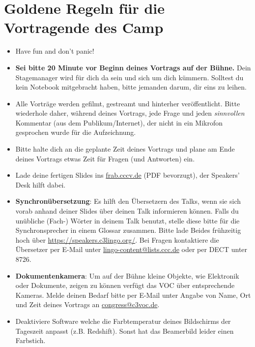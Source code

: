 \documentclass[paper=a4]{scrartcl}
\begin{document}
\section*{Goldene Regeln für die Vortragende des Camp}
\begin{itemize}
	\item Have fun and don't panic!
	\item \textbf{Sei bitte 20 Minute vor Beginn deines Vortrags auf der Bühne.} Dein Stagemanager wird für dich da sein und sich um dich kümmern. Solltest du kein Notebook mitgebracht haben, bitte jemanden darum, dir eins zu leihen.
	\item Alle Vorträge werden gefilmt, gestreamt und hinterher veröffentlicht. Bitte wiederhole daher, während deines Vortrags, jede Frage und jeden \textit{sinnvollen} Kommentar (aus dem Publikum/Internet), der nicht in ein Mikrofon gesprochen wurde für die Aufzeichnung.
	\item Bitte halte dich an die geplante Zeit deines Vortrags und plane am Ende deines Vortrags etwas Zeit für Fragen (und Antworten) ein.
	\item Lade deine fertigen Slides ins \url{frab.cccv.de} (PDF bevorzugt), der Speakers' Desk hilft dabei. %
	\item \textbf{Synchronübersetzung}: Es hilft den Übersetzern des Talks, wenn sie sich vorab anhand deiner Slides über deinen Talk informieren können. Falls du unübliche (Fach-\nobreak) Wörter in deinem Talk benutzt, stelle diese bitte für die Synchronsprecher in einem Glossar zusammen. Bitte lade Beides frühzeitig hoch über \url{https://speakers.c3lingo.org/}. Bei Fragen kontaktiere die Übersetzer per E-Mail unter \url{lingo-content@lists.ccc.de} oder per DECT unter 8726.
	\item \textbf{Dokumentenkamera}: Um auf der Bühne kleine Objekte, wie Elektronik oder Dokumente, zeigen zu können verfügt das VOC über entsprechende Kameras. Melde deinen Bedarf bitte per E-Mail unter Angabe von Name, Ort und Zeit deines Vortrags an \url{congress@c3voc.de}.
	\item Deaktiviere Software welche die Farbtemperatur deines Bildschirms der Tageszeit anpasst (z.B. Redshift). Sonst hat das Beamerbild leider einen Farbstich.
\end{itemize}
\end{document}
